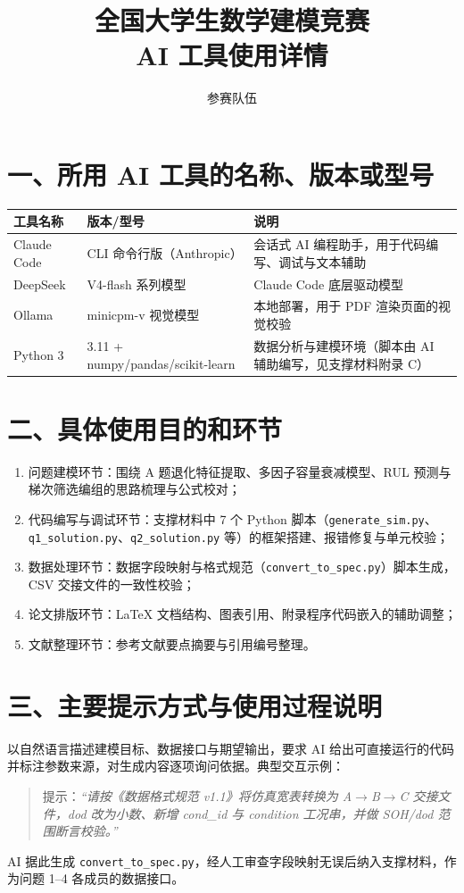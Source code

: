 \documentclass[UTF8,zihao=-4]{ctexart}
\title{\bfseries 全国大学生数学建模竞赛\\[0.3em] AI 工具使用详情}
\author{参赛队伍}
\date{}
\begin{document}
\maketitle
\vspace{-2.5em}
\section*{一、所用 AI 工具的名称、版本或型号}
\begin{table}[h!]
\centering
\begin{tabular}{@{}p{4.2cm}p{4.6cm}p{6.4cm}@{}}
\toprule
工具名称 & 版本/型号 & 说明 \\
\midrule
Claude Code & CLI 命令行版（Anthropic） & 会话式 AI 编程助手，用于代码编写、调试与文本辅助 \\
DeepSeek & V4-flash 系列模型 & Claude Code 底层驱动模型 \\
Ollama & minicpm-v 视觉模型 & 本地部署，用于 PDF 渲染页面的视觉校验 \\
Python 3 & 3.11 + numpy/pandas/scikit-learn & 数据分析与建模环境（脚本由 AI 辅助编写，见支撑材料附录 C） \\
\bottomrule
\end{tabular}
\end{table}

\section*{二、具体使用目的和环节}
\begin{enumerate}[label=(\arabic*)]
\item 问题建模环节：围绕 A 题退化特征提取、多因子容量衰减模型、RUL 预测与梯次筛选编组的思路梳理与公式校对；
\item 代码编写与调试环节：支撑材料中 7 个 Python 脚本（\texttt{generate\_sim.py}、\texttt{q1\_solution.py}、\texttt{q2\_solution.py} 等）的框架搭建、报错修复与单元校验；
\item 数据处理环节：数据字段映射与格式规范（\texttt{convert\_to\_spec.py}）脚本生成，CSV 交接文件的一致性校验；
\item 论文排版环节：\LaTeX{} 文档结构、图表引用、附录程序代码嵌入的辅助调整；
\item 文献整理环节：参考文献要点摘要与引用编号整理。
\end{enumerate}

\section*{三、主要提示方式与使用过程说明}
以自然语言描述建模目标、数据接口与期望输出，要求 AI 给出可直接运行的代码并标注参数来源，对生成内容逐项询问依据。典型交互示例：
\begin{quote}\small
提示：\emph{“请按《数据格式规范 v1.1》将仿真宽表转换为 A$\to$B$\to$C 交接文件，dod 改为小数、新增 cond\_id 与 condition 工况串，并做 SOH/dod 范围断言校验。”}
\end{quote}
AI 据此生成 \texttt{convert\_to\_spec.py}，经人工审查字段映射无误后纳入支撑材料，作为问题 1--4 各成员的数据接口。
\end{document}
